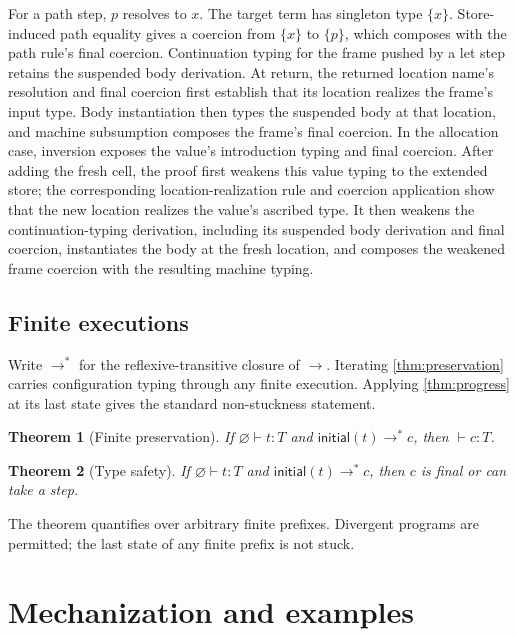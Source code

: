 \documentclass[acmsmall,screen,nonacm]{acmart}
\newtheorem{theorem}{Theorem}
\newcommand{\ctxempty}{\varnothing}
\newcommand{\sing}[1]{\{#1\}}
\newcommand{\steps}{\longrightarrow^{*}}
\newcommand{\sstep}{\longrightarrow}
\begin{document}
For a path step, \(p\) resolves to \(x\). The target term has singleton type
\(\sing{x}\). Store-induced path equality gives a coercion from
\(\sing{x}\) to \(\sing{p}\), which composes with the path rule's final
coercion. Continuation typing for the frame pushed by a let step retains the
suspended body derivation.
At return, the returned location name's resolution and final coercion first
establish that its location realizes the frame's input type. Body
instantiation then types the suspended body at that location, and machine
subsumption composes the frame's final coercion. In the allocation case,
inversion exposes the value's introduction typing and final coercion.
After adding the fresh cell, the proof first weakens this value typing to the
extended store; the corresponding location-realization rule and coercion
application show that the new location realizes the value's ascribed type. It
then weakens the continuation-typing derivation, including its suspended body
derivation and final coercion, instantiates the body at the fresh location, and composes
the weakened frame coercion with the resulting machine typing.

\subsection{Finite executions}

Write \(\steps\) for the reflexive-transitive closure of \(\sstep\).
Iterating \cref{thm:preservation} carries configuration typing through
any finite execution. Applying \cref{thm:progress} at its last state gives the
standard non-stuckness statement.

\begin{theorem}[Finite preservation]
\label{thm:finite-preservation}
If \(\ctxempty\vdash t:T\) and
\(\mathsf{initial}(t)\steps c\), then \(\vdash c:T\).
\end{theorem}

\begin{theorem}[Type safety]
\label{thm:safety}
If \(\ctxempty\vdash t:T\) and
\(\mathsf{initial}(t)\steps c\), then \(c\) is final or can take a step.
\end{theorem}

The theorem quantifies over arbitrary finite prefixes. Divergent programs are
permitted; the last state of any finite prefix is not stuck.

\section{Mechanization and examples}
\label{sec:mechanization}
\end{document}
